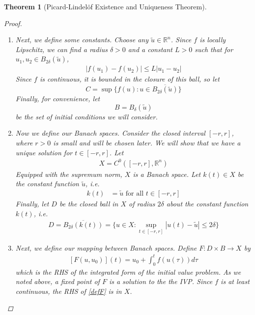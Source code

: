 \documentclass[12pt]{amsart}         %
\newtheorem{theorem}{Theorem}[section]
\theoremstyle{remark}
\newcommand{\R}{\mathbb{R}}
\begin{document}
\begin{theorem}[Picard-Lindel\"{o}f Existence and Uniqueness Theorem]
\begin{proof}
\begin{enumerate}
\item Next, we define some constants. Choose any $\tilde{u} \in \R^n$. Since $f$ is locally Lipschitz, we can find a radius $\delta > 0$ and a constant $L > 0$ such that for $u_1, u_2 \in B_{2 \delta}(\tilde{u})$,
\begin{align*}
|f(u_1) - f(u_2)| \leq L |u_1 - u_2|
\end{align*}
Since $f$ is continuous, it is bounded in the closure of this ball, so let
\[
C = \sup \{ f(u) : u \in \overline{ B_{2 \delta}(\tilde{u}) } \}
\]
Finally, for convenience, let
\[
B = B_\delta(\tilde{u})
\]
be the set of initial conditions we will consider.

\item Now we define our Banach spaces. Consider the closed interval $[-r, r]$, where $r > 0$ is small and will be chosen later. We will show that we have a unique solution for $t \in [-r, r]$. Let
\begin{align*}
X = C^0([-r, r], \R^n)
\end{align*}
Equipped with the supremum norm, $X$ is a Banach space. Let $k(t) \in X$ be the constant function $\tilde{u}$, i.e.
\begin{align*}
k(t) &= \tilde{u} \text{ for all } t \in [-r, r]
\end{align*}
Finally, let $D$ be the closed ball in $X$ of radius $2 \delta$ about the constant function $k(t)$, i.e.
\begin{align*}
D = \overline{ B_{2\delta}(k(t)) } = \{ u \in X : \sup_{t \in [-r,r]} | u(t) - \tilde{u} | \leq 2 \delta \}
\end{align*}
\item Next, we define our mapping between Banach spaces. Define $F: D \times B \rightarrow X$ by
\begin{align}\label{defF}
[F(u, u_0)](t) = u_0 + \int_0^t f(u(\tau)) d \tau
\end{align}
which is the RHS of the integrated form of the initial value problem. As we noted above, a fixed point of $F$ is a solution to the the IVP. Since $f$ is at least continuous, the RHS of \eqref{defF} is in $X$.


\end{enumerate}
\end{proof}
\end{theorem}
\end{document}
